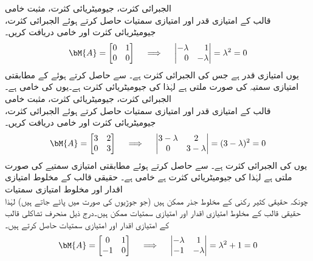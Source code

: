 \quad الجبرائی کثرت، جیومیٹریائی کثرت، مثبت خامی\\
قالب  کے امتیازی قدر اور امتیازی سمتیات حاصل کرتے ہوئے الجبرائی کثرت، جیومیٹریائی کثرت اور خامی دریافت کریں۔ 
\begin{align*}
\bM{A}=\begin{bmatrix}0&1\\0&0  \end{bmatrix}\quad \implies \quad \begin{vmatrix*}[r] -\lambda&1\\0&-\lambda \end{vmatrix*}=\lambda^2=0
\end{align*}
یوں  امتیازی قدر ہے جس کی الجبرائی کثرت  ہے۔  سے  حاصل کرتے ہوئے  کے مطابقتی امتیازی سمتیہ کی صورت  ملتی ہے لہٰذا  کی جیومیٹریائی کثرت  ہے۔یوں  کی خامی  ہے۔ 
\quad الجبرائی کثرت، جیومیٹریائی کثرت، مثبت خامی\\
قالب  کے امتیازی قدر اور امتیازی سمتیات حاصل کرتے ہوئے الجبرائی کثرت، جیومیٹریائی کثرت اور خامی دریافت کریں۔
\begin{align*}
\bM{A}=\begin{bmatrix}3&2\\0&3  \end{bmatrix}\quad \implies \quad \begin{vmatrix} 3-\lambda&2\\0&3-\lambda \end{vmatrix}=(3-\lambda)^2=0
\end{align*}
یوں  کی الجبرائی کثرت  ہے۔ سے  حاصل کرتے ہوئے مطابقتی امتیازی سمتیے کی صورت  ملتی ہے لہٰذا  کی جیومیٹریائی کثرت  ہے خامی  ہے۔ 
\quad حقیقی قالب کے مخلوط امتیازی اقدار اور مخلوط امتیازی سمتیات\\
چونکہ حقیقی کثیر رکنی کے مخلوط جذر ممکن ہیں (جو جوڑیوں کی صورت میں پائے جاتے ہیں) لہٰذا حقیقی قالب کے مخلوط امتیازی اقدار اور امتیازی سمتیات ممکن ہیں۔درج ذیل منحرف تشاکلی قالب  کے امتیازی اقدار اور امتیازی سمتیات حاصل کرتے ہیں۔
\begin{align*}
\bM{A}=\begin{bmatrix}0&1\\-1&0  \end{bmatrix}\quad \implies \quad \begin{vmatrix}-\lambda&1\\-1&-\lambda  \end{vmatrix}=\lambda^2+1=0
\end{align*}
